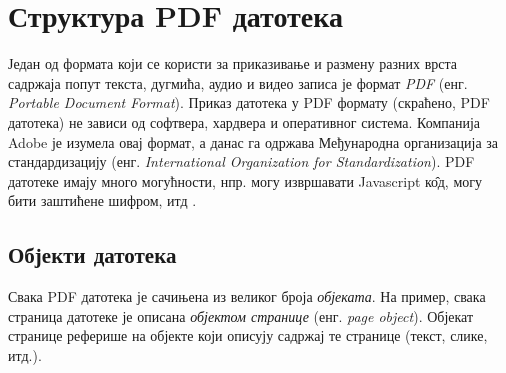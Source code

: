 \documentclass[12pt,oneside]{memoir}
\begin{document}
\chapter{Структура PDF датотека}
\label{pdfStruktura}

Један од формата који се користи за приказивање и размену разних врста садржаја попут текста, дугмића, аудио и видео записа је формат \textit{PDF} (енг. \textit{Portable Document Format}). Приказ датотека у PDF формату (скраћено, PDF датотека) не зависи од софтвера, хардвера и оперативног система. Компанија Adobe је изумела овај формат, а данас га одржава Међународна организација за стандардизацију (енг. \textit{International Organization for Standardization}). PDF датотеке имају много могућности, нпр. могу извршавати Javascript к\^{о}д, могу бити заштићене шифром, итд \cite{adobePdf1, adobePdf2}.

\section{Објекти датотека}
\label{sec:objektiPDF}

Свака PDF датотека је сачињена из великог броја \textit{објеката}. На пример, свака страница датотеке је описана \textit{објектом странице} (енг. \textit{page object}). Објекат странице реферише на објекте који описују садржај те странице (текст, слике, итд.).
\end{document}
